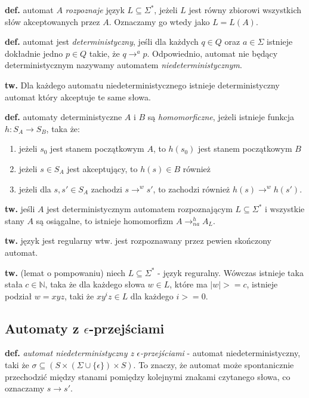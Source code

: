\documentclass[draft]{article}
\newcommand{\tw}{\textbf{tw. }}
\newcommand{\deff}{\textbf{def. }}
\begin{document}
	\deff automat  $A$ \textit{rozpoznaje} język $L \subseteq \Sigma^*$, jeżeli $L$ jest równy zbiorowi wszystkich słów akceptowanych przez $A$. Oznaczamy go wtedy jako $L = L(A)$.
	
	\deff {} automat jest \textit{deterministyczny}, jeśli dla każdych $q \in Q$ oraz $a \in \Sigma$ istnieje dokładnie jedno $p \in Q$ takie, że $q \rightarrow^a p$. Odpowiednio, automat nie będący deterministycznym nazywamy automatem \textit{niedeterministycznym}.

	\tw Dla każdego automatu niedeterministycznego istnieje deterministyczny automat który akceptuje te same słowa.

	\deff automaty deterministyczne $A$ i $B$ są \textit{homomorficzne}, jeżeli istnieje funkcja $h: S_A \rightarrow S_B$, taka że:
	\begin{enumerate}
		\item jeżeli $s_0$ jest stanem początkowym $A$, to $h(s_0)$ jest stanem początkowym $B$
		\item jeżeli $s \in S_A$ jest akceptujący, to $h(s) \in B$ również
		\item jeżeli dla $s, s' \in S_A$ zachodzi $s \rightarrow^w s'$, to zachodzi również $h(s) \rightarrow^w h(s')$.
	\end{enumerate}
	
	\tw jeśli $A$ jest deterministycznym automatem rozpoznającym $L \subseteq \Sigma^*$ i wszystkie stany $A$ są osiągalne, to istnieje homomorfizm $A \rightarrow^h_{na} A_L$. 
	
	\tw {} język jest regularny wtw. jest rozpoznawany przez pewien skończony automat.

	\tw(lemat o pompowaniu) niech $L \subseteq \Sigma^*$ - język reguralny. Wówczas istnieje taka stała $c \in \mathbb{N}$, taka że dla każdego słowa $w \in L$, które ma $|w| >= c$, istnieje podział $w = xyz$, taki że $xy^{i}z \in L$ dla każdego $i >= 0$.

\subsection{Automaty z $\epsilon$-przejściami}	
	\deff \textit{automat niedeterministyczny z $\epsilon$-przejściami} - automat niedeterministyczny, taki że $\sigma \subseteq (S \times (\Sigma \cup \{\epsilon\}) \times S)$. To znaczy, że automat może spontanicznie przechodzić między stanami pomiędzy kolejnymi znakami czytanego słowa, co oznaczamy $s \rightarrow s'$.
	
\end{document}
